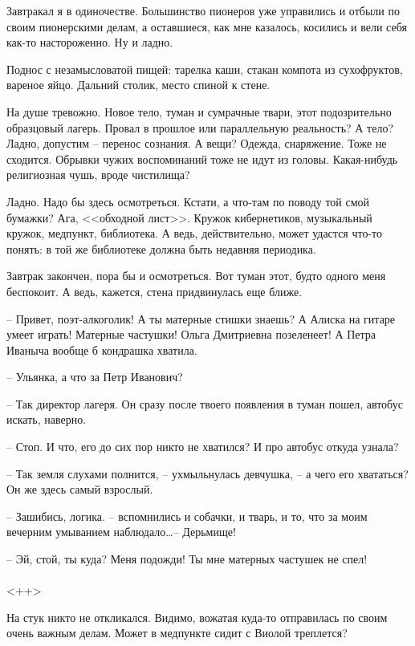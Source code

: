 \documentclass[a4paper]{book}
\begin{document}
Завтракал я в одиночестве. Большинство пионеров уже управились и отбыли по своим пионерскими делам, а оставшиеся, как мне казалось, косились и вели себя как-то настороженно. Ну и ладно. 

Поднос с незамысловатой пищей: тарелка  каши, стакан компота из сухофруктов, вареное яйцо. Дальний столик, место спиной к стене. 

На душе тревожно. Новое тело, туман и сумрачные твари, этот подозрительно образцовый лагерь. Провал в прошлое или параллельную реальность? А тело? Ладно, допустим -- перенос сознания. А вещи? Одежда, снаряжение. Тоже не сходится. Обрывки чужих воспоминаний тоже не идут из головы. Какая-нибудь религиозная чушь, вроде чистилища? 

Ладно. Надо бы здесь осмотреться. Кстати, а что-там по поводу той смой бумажки? Ага, <<обходной лист>>. Кружок кибернетиков, музыкальный кружок, медпункт, библиотека. А ведь, действительно, может удастся что-то понять: в той же библиотеке должна быть недавняя периодика. 

Завтрак закончен, пора бы и осмотреться. Вот туман этот, будто одного меня беспокоит. А ведь, кажется, стена придвинулась еще ближе.

-- Привет, поэт-алкоголик! А ты матерные стишки знаешь? А Алиска на гитаре умеет играть! Матерные частушки! Ольга Дмитриевна позеленеет! А Петра Иваныча вообще б кондрашка хватила.

-- Ульянка, а что за Петр Иванович? 

-- Так директор лагеря. Он сразу после твоего появления в туман пошел, автобус искать, наверно. 

-- Стоп. И что, его до сих пор никто не хватился? И про автобус откуда узнала?

-- Так земля слухами полнится, -- ухмыльнулась девчушка, -- а чего его хвататься? Он же здесь самый взрослый.

-- Зашибись, логика. -- вспомнились и собачки, и тварь, и то, что за моим вечерним умыванием наблюдало\ldots -- Дерьмище!

-- Эй, стой, ты куда? Меня подожди! Ты мне матерных частушек не спел!
\\
\paragraph{}<++>

На стук никто не откликался. Видимо, вожатая куда-то отправилась по своим очень важным делам. Может в медпункте сидит с Виолой треплется?
\end{document}
